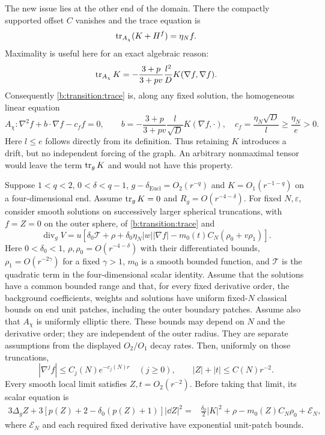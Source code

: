The new issue lies at the other end of the domain.  There the compactly
supported offset $C$ vanishes and the trace equation is
\begin{equation}\label{b:transition:trace}
 \operatorname{tr}_{A_\chi}(K+H^f)=\eta_N f.
\end{equation}
Maximality is useful here for an exact algebraic reason:
\[
 \operatorname{tr}_{A_\chi}K
 =-\frac{3+p}{3+pv}\frac{l^2}{D}K(\nabla f,\nabla f).
\]
Consequently \eqref{b:transition:trace} is, along any fixed solution,
the homogeneous linear equation
\begin{equation}\label{b:transition:drift}
 A_\chi:\nabla^2 f+b\cdot\nabla f-c_f f=0,
 \qquad
 b=-\frac{3+p}{3+pv}\frac l{\sqrt D}K(\nabla f,\cdot),
 \quad c_f=\frac{\eta_N\sqrt D}{l}\ge\frac{\eta_N}{e}>0.
\end{equation}
Here $l\le e$ follows directly from its definition.  Thus retaining $K$
introduces a drift, but no independent forcing of the graph.  An arbitrary
nonmaximal tensor would leave the term $\operatorname{tr}_gK$ and would not have this
property.

\begin{lemma}\label{b:transition:end}
Suppose $1<q<2$, $0<\delta<q-1$,
$g-\delta_{\mathrm{Eucl}}=O_2(r^{-q})$ and
$K=O_1(r^{-1-q})$ on a four-dimensional end.  Assume
$\operatorname{tr}_gK=0$ and $R_g=O(r^{-4-\delta})$.
For fixed $N,\varepsilon$, consider smooth solutions on successively
larger spherical truncations, with $f=Z=0$ on the outer sphere, of
\eqref{b:transition:trace} and
\begin{equation}\label{b:transition:divergence}
 \operatorname{div}_gV
 =u\left[\delta_0\mathcal T+\rho+
       \delta_0\eta_N |w||\nabla f|
       -m_0(t)C_N(\rho_0+v\rho_1)\right].
\end{equation}
Here $0<\delta_0<1$, $\rho,\rho_0=O(r^{-4-\delta})$ with
their differentiated bounds, $\rho_1=O(r^{-2\gamma})$ for a fixed
$\gamma>1$, $m_0$ is a smooth bounded function, and $\mathcal T$ is
the quadratic term in the four-dimensional scalar identity.
Assume that the solutions have a common bounded range and that, for every
fixed derivative order, the background coefficients, weights and
solutions have uniform fixed-$N$ classical bounds on end unit patches,
including the outer boundary patches.  Assume also that $A_\chi$ is
uniformly elliptic there.  These bounds may depend on $N$ and the
derivative order; they are independent of the outer radius.  They are
separate assumptions from the displayed $O_2/O_1$ decay rates.
Then, uniformly on those truncations,
\[
 |\nabla^j f|\le C_j(N)e^{-c_j(N)r}\quad(j\ge0),
 \qquad |Z|+|t|\le C(N)r^{-2}.
\]
Every smooth local limit satisfies $Z,t=O_2(r^{-2})$.  Before taking
that limit, its scalar equation is
\begin{equation}\label{b:transition:zero-graph}
 \begin{split}
 3\Delta_g Z
 +3[p(Z)+2-\delta_0(p(Z)+1)]|\dd Z|^2
 ={}&\tfrac{\delta_0}{2}|K|^2+\rho
       -m_0(Z)C_N\rho_0+\mathcal E_N,
 \end{split}
\end{equation}
where $\mathcal E_N$ and each required fixed derivative have
exponential unit-patch bounds.
\end{lemma}

